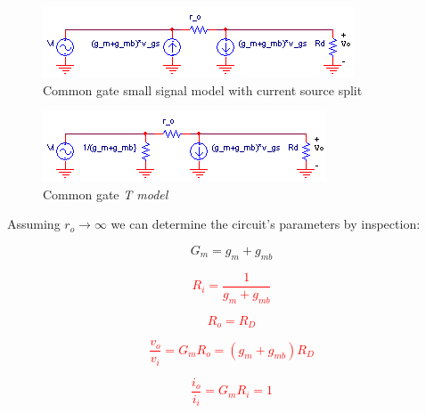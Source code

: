 \begin{figure}[h]
	\centering
		\includegraphics{schematics/ss_commongate_split.PNG}
	\caption{Common gate small signal model with current source split}
	\label{fig:ss_commongate_split}
\end{figure}

\begin{figure}[h]
	\centering
		\includegraphics{schematics/ss_commongate_T_model.PNG}
		\caption{Common gate \textsl{T model}}
	\label{fig:ss_commongate_T_model}
\end{figure}

Assuming $r_{o} \rightarrow \infty$ we can determine the circuit's parameters by inspection:

\begin{equation}
G_{m} = g_{m} + g_{mb}
\end{equation}

\textcolor{red}{
\begin{equation}
R_{i} = \frac{1}{g_{m}+g_{mb}}
\end{equation}
}

\textcolor{red}{
\begin{equation}
R_{o} = R_{D}
\label{eq:common_gate_Ro}
\end{equation}
}

\textcolor{red}{
\begin{equation}
\frac{v_{o}}{v_{i}} = G_{m}R_{o} = (g_{m}+g_{mb})R_{D}
\end{equation}
}

\textcolor{red}{
\begin{equation}
\frac{i_{o}}{i_{i}} = G_{m}R_{i} = 1
\end{equation}
}

